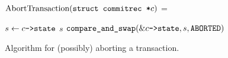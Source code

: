 \documentclass[11pt,notitlepage]{article}
\newcommand{\ptr}{\code{->}}
\newcommand{\codesize}{\scriptsize}
\begin{document}
\begin{figure}
$\text{AbortTransaction}(\texttt{struct commitrec *} c)$ =
\begin{myalgorithmic}
  \RETURN {}
\ENDIF
\LOOP
  \STATE $s \gets c\ptr\code{state}$
    \RETURN $s$
  \ENDIF
  \STATE $\code{compare\_and\_swap}(\&c\ptr\code{state}, s, \code{ABORTED})$
\ENDLOOP*
\end{myalgorithmic}
\caption{Algorithm for (possibly) aborting a transaction.}
\label{fig:aborttrans}
\end{figure}




\end{document}
